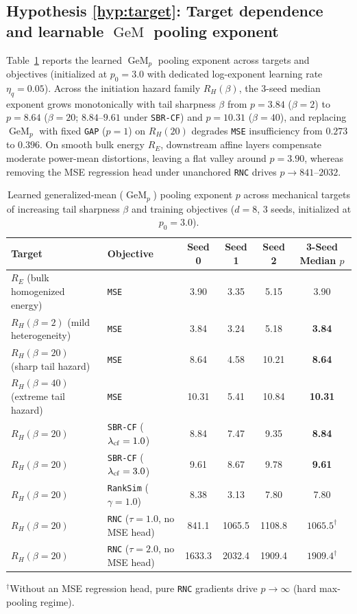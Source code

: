 \documentclass[preprint,11pt,a4paper]{elsarticle}
\newcommand{\GeM}{\operatorname{GeM}}
\begin{document}
\subsection{Hypothesis \ref{hyp:target}: Target dependence and learnable $\GeM$ pooling exponent}

Table~\ref{tab:gem_exponent} reports the learned $\GeM_p$ pooling exponent across targets and objectives (initialized at $p_0=3.0$ with dedicated log-exponent learning rate $\eta_q=0.05$). Across the initiation hazard family $R_H(\beta)$, the 3-seed median exponent grows monotonically with tail sharpness $\beta$ from $p=3.84$ ($\beta=2$) to $p=8.64$ ($\beta=20$; $8.84\text{--}9.61$ under \texttt{SBR-CF}) and $p=10.31$ ($\beta=40$), and replacing $\GeM_p$ with fixed \texttt{GAP} ($p=1$) on $R_H(20)$ degrades \texttt{MSE} insufficiency from $0.273$ to $0.396$. On smooth bulk energy $R_E$, downstream affine layers compensate moderate power-mean distortions, leaving a flat valley around $p=3.90$, whereas removing the MSE regression head under unanchored \texttt{RNC} drives $p\to 841\text{--}2032$.

\begin{table}[ht!]
\centering
\caption{Learned generalized-mean ($\GeM_p$) pooling exponent $p$ across mechanical targets of increasing tail sharpness $\beta$ and training objectives ($d=8$, 3 seeds, initialized at $p_0=3.0$).}
\label{tab:gem_exponent}
\footnotesize
\setlength{\tabcolsep}{5.0pt}
\begin{tabular}{llcccc}
\toprule
Target & Objective & Seed 0 & Seed 1 & Seed 2 & 3-Seed Median $p$ \\
\midrule
$R_E$ (bulk homogenized energy) & \texttt{MSE} & 3.90 & 3.35 & 5.15 & 3.90 \\
$R_H(\beta=2)$ (mild heterogeneity) & \texttt{MSE} & 3.84 & 3.24 & 5.18 & \textbf{3.84} \\
$R_H(\beta=20)$ (sharp tail hazard) & \texttt{MSE} & 8.64 & 4.58 & 10.21 & \textbf{8.64} \\
$R_H(\beta=40)$ (extreme tail hazard) & \texttt{MSE} & 10.31 & 5.41 & 10.84 & \textbf{10.31} \\
\midrule
$R_H(\beta=20)$ & \texttt{SBR-CF} ($\lambda_{\rm cf}=1.0$) & 8.84 & 7.47 & 9.35 & \textbf{8.84} \\
$R_H(\beta=20)$ & \texttt{SBR-CF} ($\lambda_{\rm cf}=3.0$) & 9.61 & 8.67 & 9.78 & \textbf{9.61} \\
$R_H(\beta=20)$ & \texttt{RankSim} ($\gamma=1.0$) & 8.38 & 3.13 & 7.80 & 7.80 \\
$R_H(\beta=20)$ & \texttt{RNC} ($\tau=1.0$, no MSE head) & 841.1 & 1065.5 & 1108.8 & $1065.5^{\dagger}$ \\
$R_H(\beta=20)$ & \texttt{RNC} ($\tau=2.0$, no MSE head) & 1633.3 & 2032.4 & 1909.4 & $1909.4^{\dagger}$ \\
\bottomrule
\end{tabular}
\par\smallskip\raggedright{\footnotesize $^\dagger$Without an MSE regression head, pure \texttt{RNC} gradients drive $p\to\infty$ (hard max-pooling regime).}
\end{table}
\end{document}
